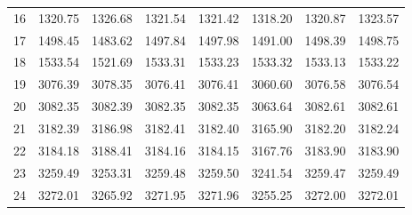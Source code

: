 \documentclass[10pt,oneside]{article}
\begin{document}
\begin{table}[h!]
\begin{tabular}{cccccccc}
16 &   1320.75 & 1326.68 & 1321.54 & 1321.42 &      1318.20 & 1320.87 & 1323.57 \\
17 &   1498.45 & 1483.62 & 1497.84 & 1497.98 &      1491.00 & 1498.39 & 1498.75 \\
18 &   1533.54 & 1521.69 & 1533.31 & 1533.23 &      1533.32 & 1533.13 & 1533.22 \\
19 &   3076.39 & 3078.35 & 3076.41 & 3076.41 &      3060.60 & 3076.58 & 3076.54 \\
20 &   3082.35 & 3082.39 & 3082.35 & 3082.35 &      3063.64 & 3082.61 & 3082.61 \\
21 &   3182.39 & 3186.98 & 3182.41 & 3182.40 &      3165.90 & 3182.20 & 3182.24 \\
22 &   3184.18 & 3188.41 & 3184.16 & 3184.15 &      3167.76 & 3183.90 & 3183.90 \\
23 &   3259.49 & 3253.31 & 3259.48 & 3259.50 &      3241.54 & 3259.47 & 3259.49 \\
24 &   3272.01 & 3265.92 & 3271.95 & 3271.96 &      3255.25 & 3272.00 & 3272.01 \\
\bottomrule
\end{tabular}
\end{table}

\clearpage
\end{document}
